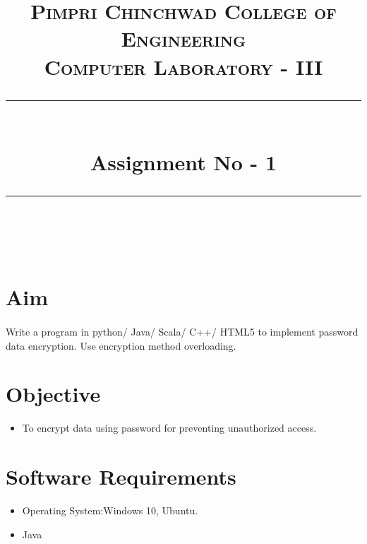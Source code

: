 \documentclass[a4paper,12pt]{article}
\title{
	\normalfont \normalsize 
	\textsc{Pimpri Chinchwad College of Engineering \\ 
		Computer Laboratory - III} \\
	[10pt] 
	\rule{\linewidth}{0.5pt} \\[6pt] 
	\huge Assignment No - 1\\
	\rule{\linewidth}{2pt}  \\[10pt]
}
\author{}
\date{\normalsize}
\newenvironment{codeblock}{\fontfamily{ccr}\selectfont}{\par}
\begin{document}
\maketitle

\section{Aim}
	\paragraph{}Write a program in python/ Java/ Scala/ C++/ HTML5 to implement password data encryption. Use encryption method overloading.
	
\section{Objective}
	\begin{itemize}
		\item To encrypt data using password for preventing unauthorized access.
	\end{itemize}
	
\section{Software Requirements}
	\begin{itemize}
		\item   Operating System:Windows 10, Ubuntu.
		\item	Java
	\end{itemize}
	
\end{document}
